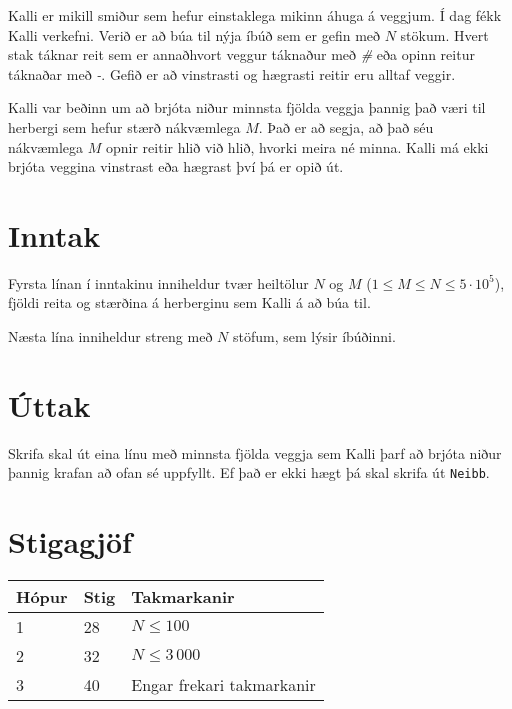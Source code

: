 
Kalli er mikill smiður sem hefur einstaklega mikinn áhuga á veggjum. Í
dag fékk Kalli verkefni. Verið er að búa til nýja íbúð sem er gefin með
$N$ stökum. Hvert stak táknar reit sem er annaðhvort veggur táknaður með \textit{\#} eða opinn
reitur táknaðar með \textit{-}. Gefið er að vinstrasti og hægrasti reitir eru alltaf veggir.

Kalli var beðinn um að brjóta niður minnsta fjölda veggja þannig það væri til herbergi sem hefur
stærð nákvæmlega $M$. Það er að segja, að það séu nákvæmlega $M$ opnir reitir hlið við hlið, hvorki
meira né minna. Kalli má ekki brjóta veggina vinstrast eða hægrast því þá er opið út.

\section*{Inntak}
Fyrsta línan í inntakinu inniheldur tvær heiltölur $N$ og $M$ ($1 \leq M \leq N \leq 5\cdot 10^5$),
fjöldi reita og stærðina á herberginu sem Kalli á að búa til.

Næsta lína inniheldur streng með $N$ stöfum, sem lýsir íbúðinni.

\section*{Úttak}
Skrifa skal út eina línu með minnsta fjölda veggja sem Kalli þarf að brjóta niður
þannig krafan að ofan sé uppfyllt. Ef það er ekki hægt þá skal skrifa út \texttt{Neibb}.

\section*{Stigagjöf}
\begin{tabular}{|l|l|l|}
\hline
Hópur & Stig & Takmarkanir \\ \hline
1     & 28   & $N \leq 100$ \\ \hline
2     & 32   & $N \leq 3\,000$ \\ \hline
3     & 40   & Engar frekari takmarkanir \\ \hline
\end{tabular}

